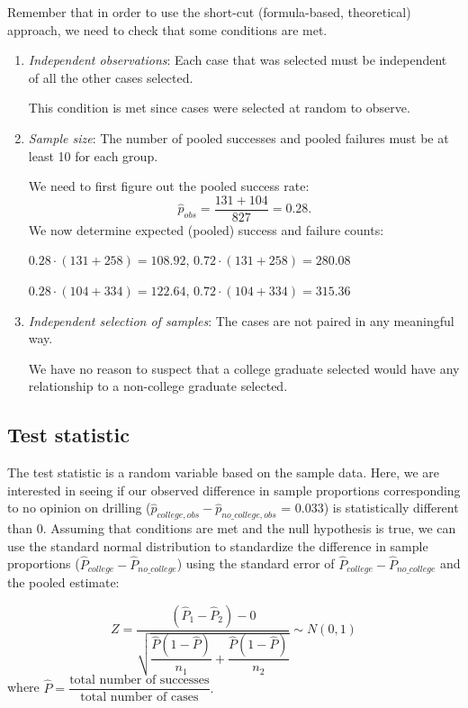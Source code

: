 \documentclass[12pt,]{krantz}
\theoremstyle{definition}
\theoremstyle{definition}
\theoremstyle{definition}
\theoremstyle{remark}
\begin{document}
Remember that in order to use the short-cut (formula-based, theoretical)
approach, we need to check that some conditions are met.

\begin{enumerate}
\def\labelenumi{\arabic{enumi}.}
\item
  \emph{Independent observations}: Each case that was selected must be
  independent of all the other cases selected.

  This condition is met since cases were selected at random to observe.
\item
  \emph{Sample size}: The number of pooled successes and pooled failures
  must be at least 10 for each group.

  We need to first figure out the pooled success rate:
  \[\hat{p}_{obs} = \dfrac{131 + 104}{827} = 0.28.\] We now determine
  expected (pooled) success and failure counts:

  \(0.28 \cdot (131 + 258) = 108.92\),
  \(0.72 \cdot (131 + 258) = 280.08\)

  \(0.28 \cdot (104 + 334) = 122.64\),
  \(0.72 \cdot (104 + 334) = 315.36\)
\item
  \emph{Independent selection of samples}: The cases are not paired in
  any meaningful way.

  We have no reason to suspect that a college graduate selected would
  have any relationship to a non-college graduate selected.
\end{enumerate}

\subsection{Test statistic}\label{test-statistic-2}

The test statistic is a random variable based on the sample data. Here,
we are interested in seeing if our observed difference in sample
proportions corresponding to no opinion on drilling
(\(\hat{p}_{college, obs} - \hat{p}_{no\_college, obs}\) = 0.033) is
statistically different than 0. Assuming that conditions are met and the
null hypothesis is true, we can use the standard normal distribution to
standardize the difference in sample proportions
(\(\hat{P}_{college} - \hat{P}_{no\_college}\)) using the standard error
of \(\hat{P}_{college} - \hat{P}_{no\_college}\) and the pooled
estimate:

\[ Z =\dfrac{ (\hat{P}_1 - \hat{P}_2) - 0}{\sqrt{\dfrac{\hat{P}(1 - \hat{P})}{n_1} + \dfrac{\hat{P}(1 - \hat{P})}{n_2} }} \sim N(0, 1) \]
where
\(\hat{P} = \dfrac{\text{total number of successes} }{ \text{total number of cases}}.\)
\end{document}
